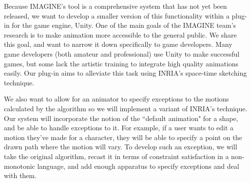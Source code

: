 Because IMAGINE's tool is a comprehensive system that has not yet been released, we want to develop a smaller version of this functionality within a plug-in for the game engine, Unity. One of the main goals of the IMAGINE team's research is to make animation more accessible to the general public. We share this goal, and want to narrow it down specifically to game developers. Many game developers (both amateur and professional) use Unity to make successful games, but some lack the artistic training to integrate high quality animations easily. Our plug-in aims to alleviate this task using INRIA's space-time sketching technique. 

We also want to allow for an animator to specify exceptions to the motions calculated by the algorithm so we will implement a variant of INRIA's technique. Our system will incorporate the notion of the ``default animation" for a shape, and be able to handle exceptions to it. For example, if a user wants to edit a motion they've made for a character, they will be able to specify a point on the drawn path where the motion will vary. To develop such an exception, we will take the original algorithm, recast it in  terms of constraint satisfaction in a non-monotonic language, and add enough apparatus to specify exceptions and deal with them.
